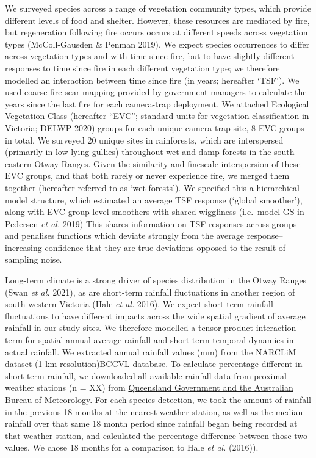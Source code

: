 \documentclass[11pt,a4paper,titlepage,twoside,openright]{style/unimelbthesis}
\begin{document}
\begin{mainmatter}
We surveyed species across a range of vegetation community types, which provide different levels of food and shelter. However, these resources are mediated by fire, but regeneration following fire occurs occurs at different speeds across vegetation types (McColl-Gausden \& Penman 2019). We expect species occurrences to differ across vegetation types and with time since fire, but to have slightly different responses to time since fire in each different vegetation type; we therefore modelled an interaction between time since fire (in years; hereafter `TSF'). We used coarse fire scar mapping provided by government managers to calculate the years since the last fire for each camera-trap deployment. We attached Ecological Vegetation Class (hereafter ``EVC''; standard units for vegetation classification in Victoria; DELWP 2020) groups for each unique camera-trap site, 8 EVC groups in total. We surveyed 20 unique sites in rainforests, which are interspersed (primarily in low lying gullies) throughout wet and damp forests in the south-eastern Otway Ranges. Given the similarity and finescale interspersion of these EVC groups, and that both rarely or never experience fire, we merged them together (hereafter referred to as `wet forests'). We specified this a hierarchical model structure, which estimated an average TSF response (`global smoother'), along with EVC group-level smoothers with shared wiggliness (i.e.~model GS in Pedersen \emph{et al.} 2019) This shares information on TSF responses across groups and penalises functions which deviate strongly from the average response--increasing confidence that they are true deviations opposed to the result of sampling noise.

Long-term climate is a strong driver of species distribution in the Otway Ranges (Swan \emph{et al.} 2021), as are short-term rainfall fluctuations in another region of south-western Victoria (Hale \emph{et al.} 2016). We expect short-term rainfall fluctuations to have different impacts across the wide spatial gradient of average rainfall in our study sites. We therefore modelled a tensor product interaction term for spatial annual average rainfall and short-term temporal dynamics in actual rainfall. We extracted annual rainfall values (mm) from the NARCLiM dataset (1-km resolution)\href{\%22https://app.bccvl.org.au/datasets?iframe\#c12=modified\&reversed=on\&b_start=0\&c2=4816d016b9af4fb18f6cc8b2f1f979dc\%22}{BCCVL database}. To calculate percentage different in short-term rainfall, we downloaded all available rainfall data from proximal weather stations (n = XX) from \href{\%22https://www.longpaddock.qld.gov.au/silo/point-data/\%22}{Queensland Government and the Australian Bureau of Meteorology}. For each species detection, we took the amount of rainfall in the previous 18 months at the nearest weather station, as well as the median rainfall over that same 18 month period since rainfall began being recorded at that weather station, and calculated the percentage difference between those two values. We chose 18 months for a comparison to Hale \emph{et al.} (2016)).


\end{mainmatter}
\end{document}
